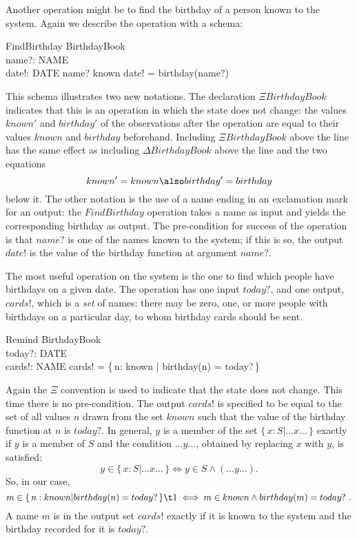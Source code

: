 \documentclass{llncs}
\begin{document}
Another operation might be to find the
birthday of a person known to the system. Again we describe
the operation with a schema:
\begin{schema}{FindBirthday}
	\Xi BirthdayBook \\
	name?: NAME \\
	date!: DATE
\where
	name? \in known
\also
	date! = birthday(name?)
\end{schema}
This schema illustrates two new notations.  The
declaration $\Xi BirthdayBook$ indicates that
this is an operation in which the state does not change: the values $known'$
and $birthday'$ of the observations after the operation are equal to
their values $known$ and $birthday$ beforehand. Including $\Xi
BirthdayBook$ above the line has the same effect as including $\Delta
BirthdayBook$ above the line and the two equations
\[
	known' = known
\also
	birthday' = birthday
\]
below it. The other notation is the use of a name ending in
an exclamation mark for an output: the
$FindBirthday$ operation takes
a name as input and yields
the corresponding birthday as output.
\pagebreak[1]
The pre-condition for success
of the operation is that
$name?$ is one of the names known to the system; if this is
so, the output $date!$ is the value of the birthday function
at argument $name?$.

The most useful operation on the system is the one to find
which people have birthdays on a given date.  The operation has one
input $today?$, and one output, $cards!$, which is a {\em set\/} of names:
there may be zero, one, or more people with birthdays on a
particular day, to whom birthday cards should be sent.
\begin{schema}{Remind}
	\Xi BirthdayBook \\
	today?: DATE \\
	cards!: \power NAME
\where
	cards! = \{\,n: known | birthday(n) = today?\,\}
\end{schema}
Again the $\Xi$ convention is used to indicate that the
state does not change. This time there is no pre-condition.
The output $cards!$ is specified to be equal to the set of
all values $n$ drawn from the set $known$ such that the
value of the birthday function at $n$ is $today?$. In general,
$y$ is a member of the set $\{\,x:S | \ldots x \ldots\,\}$
exactly if $y$ is a member of $S$ and the condition $\ldots
y \ldots$, obtained by replacing $x$ with $y$, is satisfied:
\[ y \in \{\,x: S | \ldots x \ldots \,\}
	\iff y \in S \land (\ldots y \ldots). \]
So, in our case,
\[ m \in \{\,n: known | birthday(n) = today?\,\} \\
\t1 		\iff m \in known \land birthday(m) = today?~. \]
A name $m$ is in the output set $cards!$ exactly if it is
known to the system and the birthday recorded for it is
$today?$.
\end{document}
